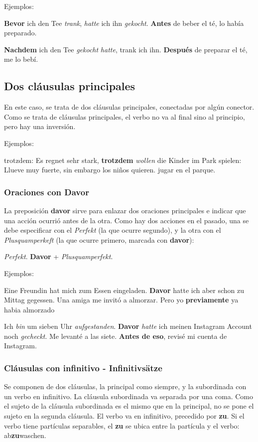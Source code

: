 Ejemplos:

\textbf{Bevor} ich den Tee \textit{trank}, \textit{hatte} ich ihn \textit{gekocht}. \textbf{Antes} de beber el té, lo había preparado.

\textbf{Nachdem} ich den Tee \textit{gekocht} \textit{hatte}, trank ich ihn. \textbf{Después} de preparar el té, me lo bebí.


\subsection{Dos cláusulas principales}
En este caso, se trata de dos cláusulas principales, conectadas por algún conector. Como se trata de cláusulas principales, el verbo no va al final sino al principio, pero hay una inversión.

Ejemplos:
\begin{myitemize}
\item trotzdem: Es regnet sehr stark, \textbf{trotzdem} \textit{wollen} die Kinder im Park spielen: Llueve muy fuerte, sin embargo los niños quieren. jugar en el parque.
\end{myitemize}


\subsubsection{Oraciones con Davor}
La preposición \textbf{davor} sirve para enlazar dos oraciones principales e indicar que una acción ocurrió antes de la otra. Como hay dos acciones en el pasado, una se debe especificar con el \textit{Perfekt} (la que ocurre segundo), y la otra con el \textit{Plusquamperkeft} (la que ocurre primero, marcada con \textbf{davor}):

\textit{Perfekt}. \textbf{Davor} + \textit{Plusquamperfekt}.

Ejemplos:

Eine Freundin hat mich zum Essen eingeladen. \textbf{Davor} hatte ich aber schon zu Mittag gegessen. Una amiga me invitó a almorzar. Pero yo \textbf{previamente} ya habia almorzado

Ich \textit{bin} um sieben Uhr \textit{aufgestanden}. \textbf{Davor} \textit{hatte} ich meinen Instagram Account noch \textit{gecheckt}. Me levanté a las siete. \textbf{Antes de eso}, revisé mi cuenta de Instagram.



\subsubsection{Cláusulas con infinitivo - Infinitivsätze}
Se componen de dos cláusulas, la principal como siempre, y la subordinada con un verbo en infinitivo. La cláusula subordinada va separada por una coma. Como el sujeto de la cláusula subordinada es el mismo que en la principal, no se pone el sujeto en la segunda cláusula. El verbo va en infinitivo, precedido por \textbf{zu}. Si el verbo tiene partículas separables, el \textbf{zu} se ubica entre la partícula y el verbo: ab\textbf{zu}waschen.


